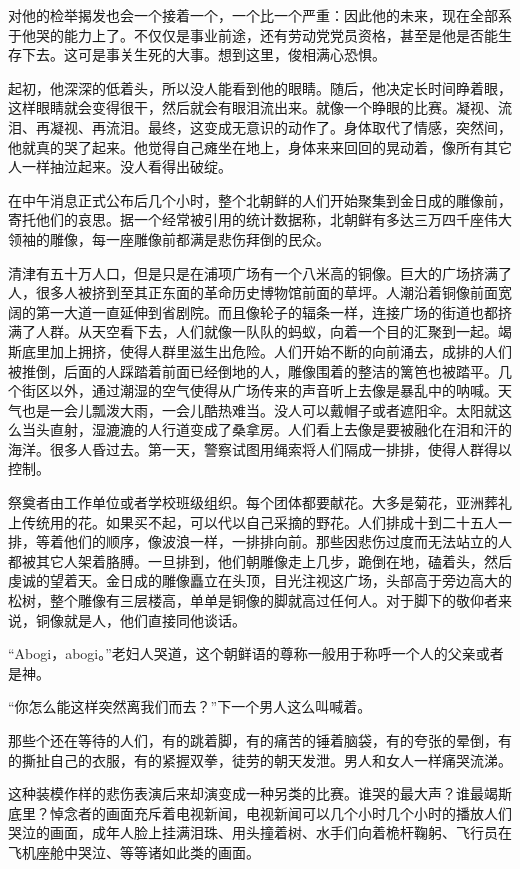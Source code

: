 对他的检举揭发也会一个接着一个，一个比一个严重：因此他的未来，现在全部系于他哭的能力上了。不仅仅是事业前途，还有劳动党党员资格，甚至是他是否能生存下去。这可是事关生死的大事。想到这里，俊相满心恐惧。

起初，他深深的低着头，所以没人能看到他的眼睛。随后，他决定长时间睁着眼，这样眼睛就会变得很干，然后就会有眼泪流出来。就像一个睁眼的比赛。凝视、流泪、再凝视、再流泪。最终，这变成无意识的动作了。身体取代了情感，突然间，他就真的哭了起来。他觉得自己瘫坐在地上，身体来来回回的晃动着，像所有其它人一样抽泣起来。没人看得出破绽。

在中午消息正式公布后几个小时，整个北朝鲜的人们开始聚集到金日成的雕像前，寄托他们的哀思。据一个经常被引用的统计数据称，北朝鲜有多达三万四千座伟大领袖的雕像，每一座雕像前都满是悲伤拜倒的民众。

清津有五十万人口，但是只是在浦项广场有一个八米高的铜像。巨大的广场挤满了人，很多人被挤到至其正东面的革命历史博物馆前面的草坪。人潮沿着铜像前面宽阔的第一大道一直延伸到省剧院。而且像轮子的辐条一样，连接广场的街道也都挤满了人群。从天空看下去，人们就像一队队的蚂蚁，向着一个目的汇聚到一起。竭斯底里加上拥挤，使得人群里滋生出危险。人们开始不断的向前涌去，成排的人们被推倒，后面的人踩踏着前面已经倒地的人，雕像围着的整洁的篱笆也被踏平。几个街区以外，通过潮湿的空气使得从广场传来的声音听上去像是暴乱中的呐喊。天气也是一会儿瓢泼大雨，一会儿酷热难当。没人可以戴帽子或者遮阳伞。太阳就这么当头直射，湿漉漉的人行道变成了桑拿房。人们看上去像是要被融化在泪和汗的海洋。很多人昏过去。第一天，警察试图用绳索将人们隔成一排排，使得人群得以控制。

祭奠者由工作单位或者学校班级组织。每个团体都要献花。大多是菊花，亚洲葬礼上传统用的花。如果买不起，可以代以自己采摘的野花。人们排成十到二十五人一排，等着他们的顺序，像波浪一样，一排排向前。那些因悲伤过度而无法站立的人都被其它人架着胳膊。一旦排到，他们朝雕像走上几步，跪倒在地，磕着头，然后虔诚的望着天。金日成的雕像矗立在头顶，目光注视这广场，头部高于旁边高大的松树，整个雕像有三层楼高，单单是铜像的脚就高过任何人。对于脚下的敬仰者来说，铜像就是人，他们直接同他谈话。

“Abogi，abogi。”老妇人哭道，这个朝鲜语的尊称一般用于称呼一个人的父亲或者是神。

“你怎么能这样突然离我们而去？”下一个男人这么叫喊着。

那些个还在等待的人们，有的跳着脚，有的痛苦的锤着脑袋，有的夸张的晕倒，有的撕扯自己的衣服，有的紧握双拳，徒劳的朝天发泄。男人和女人一样痛哭流涕。

这种装模作样的悲伤表演后来却演变成一种另类的比赛。谁哭的最大声？谁最竭斯底里？悼念者的画面充斥着电视新闻，电视新闻可以几个小时几个小时的播放人们哭泣的画面，成年人脸上挂满泪珠、用头撞着树、水手们向着桅杆鞠躬、飞行员在飞机座舱中哭泣、等等诸如此类的画面。

